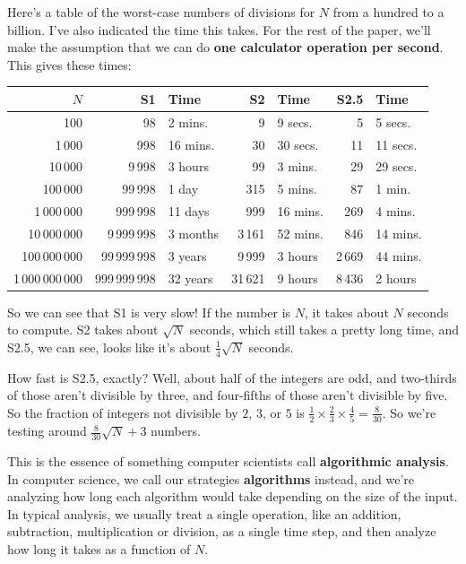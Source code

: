 \documentclass[11pt,paper=letter]{scrartcl}
\begin{document}
Here's a table of the worst-case numbers of divisions for $N$ from a hundred to a billion. I've also indicated the time this takes. For the rest of the paper, we'll make the assumption that we can do \textbf{one calculator operation per second}. This gives these times:
\begin{center}
\begin{tabular}{rrlrlrl}
$N$                & S1    & Time     & S2 & Time     & S2.5 & Time     \\ \hline
100              & 98            & 2 mins.  & 9          & 9 secs.  & 5          & 5 secs.  \\
1\,000           & 998           & 16 mins. & 30         & 30 secs. & 11         & 11 secs. \\
10\,000          & 9\,998        & 3 hours  & 99         & 3 mins.  & 29         & 29 secs. \\
100\,000         & 99\,998       & 1 day    & 315        & 5 mins.  & 87         & 1 min.   \\
1\,000\,000      & 999\,998      & 11 days  & 999        & 16 mins. & 269        & 4 mins.  \\
10\,000\,000     & 9\,999\,998   & 3 months & 3\,161     & 52 mins. & 846        & 14 mins.  \\
100\,000\,000    & 99\,999\,998  & 3 years  & 9\,999     & 3 hours  & 2\,669     & 44 mins. \\
1\,000\,000\,000 & 999\,999\,998 & 32 years & 31\,621    & 9 hours  & 8\,436     & 2 hours
\end{tabular}
\end{center}

So we can see that S1 is very slow! If the number is $N$, it takes about $N$ seconds to compute. S2 takes about $\sqrt{N}$ seconds, which still takes a pretty long time, and S2.5, we can see, looks like it's about $\frac14\sqrt{N}$ seconds.

How fast is S2.5, exactly? Well, about half of the integers are odd, and two-thirds of those aren't divisible by three, and four-fifths of those aren't divisible by five. So the fraction of integers not divisible by $2$, $3$, or $5$ is $\frac12 \times \frac23 \times \frac45 = \frac8{30}$. So we're testing around $\frac8{30}\sqrt{N} + 3$ numbers.

This is the essence of something computer scientists call \textbf{algorithmic analysis}. In computer science, we call our strategies \textbf{algorithms} instead, and we're analyzing how long each algorithm would take depending on the size of the input. In typical analysis, we usually treat a single operation, like an addition, subtraction, multiplication or division, as a single time step, and then analyze how long it takes as a function of $N$.
\end{document}
